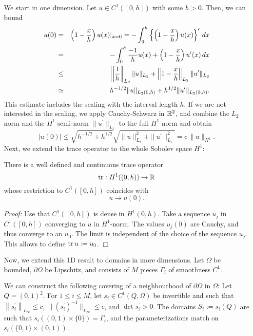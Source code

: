 We start in one dimension. Let $u \in C^1 ([0,h])$ with some $h > 0$. Then,
we can bound 
\begin{eqnarray*}
u(0) & = & \left(1 - \frac{x}{h} \right) u(x) |_{x=0} = 
        - \int_0^h \left\{ \left(1-\frac{x}{h} \right) u(x) \right\}^\prime \, dx \\
        & = & -\int_0^h  \frac{-1}{h} u(x) + \left(1-\frac{x}{h} \right) u^\prime(x)  \, dx \\
        & \leq & \left\| \frac{1}{h} \right\|_{L_2} \| u \|_{L_2} + 
                \left\| 1-\frac{x}{h} \right\|_{L_2} \| u^\prime \|_{L_2} \\
        & \simeq & h^{-1/2} \| u \|_{L_2(0,h)} + h^{1/2} \| u^\prime \|_{L_2(0,h)}.
\end{eqnarray*}
This estimate includes the scaling with the interval length $h$. 
If we are not interested in the scaling, we apply Cauchy-Schwarz in ${\mathbb R}^2$,
and combine the $L_2$ norm and the $H^1$ semi-norm $\|u^\prime\|_{L_2}$ to the full $H^1$ norm and obtain
$$
|u(0)| \leq \sqrt{h^{-1/2} + h^{1/2} } \sqrt{ \| u \|_{L_2}^2 + \| u^\prime \|_{L_2}^2 } = c \, \| u \|_{H^1}.
$$
Next, we extend the trace operator to the whole Sobolev space $H^1$:
\begin{theorem} There is a well defined and continuous trace operator
$$
\operatorname{tr} : H^1((0,h)) \rightarrow {\mathbb R}
$$
whose restriction to $C^1([0,h])$ coincides with
$$
u \rightarrow u(0).
$$
\end{theorem}
{\em Proof:} Use that $C^1([0,h])$ is dense in $H^1(0,h)$. Take a sequence
$u_j$ in $C^1([0,h])$ converging to $u$ in $H^1$-norm. The values 
$u_j(0)$ are Cauchy, and thus converge to an $u_0$. The limit is independent 
of the choice of the sequence $u_j$. This allows to define $\operatorname{tr} u := u_0$.
\hfill $\Box$

\medskip

Now, we extend this 1D result to domains in more dimensions. Let
$\Omega$ be bounded, $\partial \Omega$ be Lipschitz, and consists of
$M$ pieces $\Gamma_i$ of smoothness $C^1$. 

We can construct the following covering of a neighbourhood of 
$\partial \Omega$ in $\Omega$: Let $Q = (0,1)^2$. For $1 \leq i \leq M$, 
let $s_i \in C^1 (Q, \Omega)$ be invertible and such that $\left\| s_i^\prime \right\|_{L_\infty} \leq c$,
 $\| (s_i^\prime)^{-1} \|_{L_\infty} \leq c$, and $\operatorname{det} s_i^\prime > 0$. The domains $S_i := s_i(Q)$ are
such that $s_i( (0,1) \times \{ 0 \} ) = \Gamma_i$, and the parameterizations
match on $s_i( \{ 0,1 \} \times (0,1) )$.

